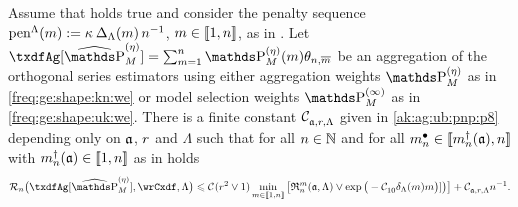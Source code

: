 \begin{thm}\label{ak:ag:ub:pnp:mm}
Assume that  holds true and consider the penalty sequence $\penSv:=\penD$, $\Di\in\nset{1,n}$, as in .
Let $\txdfAg[{\erWe[]}]=\sum_{\Di=1}^{\ssY} \We\txdfPr$ be an aggregation of the orthogonal series estimators using either aggregation weights $\rWe[]$ as in \eqref{freq:ge:shape:kn:we} or model selection weights $\msWe[]$ as in \eqref{freq:ge:shape:uk:we}. %
There is a finite constant $\cst{\xdfCw[],\xdfCr,\Lambda}$ given in
\eqref{ak:ag:ub:pnp:p8} depending only on $\xdfCw[]$, $\xdfCr$ and $\Lambda$ such that for all
$\ssY\in\Nz$ and for all $\sDi{\ssY}\in\nset{\aDi{\ssY}(\xdfCw[]),\ssY}$  with
 $\aDi{\ssY}(\xdfCw[])\in\nset{1,n}$ as in  holds 
 \begin{equation}\label{ak:ag:ub:pnp:mm:e1}
 \nRi{\txdfAg[{\erWe[]}]}{\rwCxdf,\Lambda}
    \leq 
   \cst{}(\xdfCr^2\vee1)\min_{\Di\in\nset{1,\ssY}}\big[\daRa{\Di}{(\xdfCw[],\Lambda)}\vee\exp\big(-\cst{10}\cmiSv\Di\big)]\big)\big]
   +\cst{\xdfCw[],\xdfCr,\Lambda}\ssY^{-1}.
\end{equation}
\reEnd
\end{thm}

